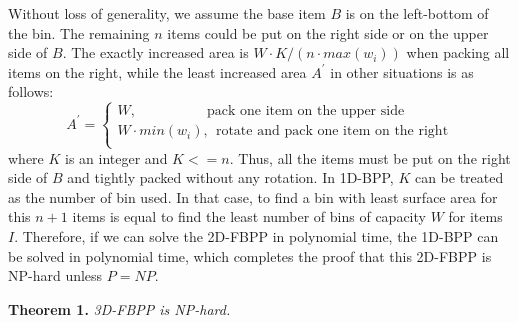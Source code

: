 Without loss of generality, we assume the base item $B$ is on the left-bottom of the bin. The remaining $n$ items could be put on the right side or on the upper side of $B$. The exactly increased area is $W\cdot K/(n\cdot max(w_i))$ when packing all items on the right, while the least increased area $A^{'}$ in other situations is as follows:
$$A^{'}=
\begin{cases}
W, \qquad\qquad\quad \text{pack one item on the upper side}\\
W \cdot min(w_i), \ \ \text{rotate and pack one item on the right} \\
\end{cases}
$$ 
where $K$ is an integer and $K<=n$. Thus, all the items must be put on the right side of $B$ and tightly packed without any rotation. In 1D-BPP, $K$ can be treated as the number of bin used. In that case, to find a bin with least surface area for this $n+1$ items is equal to find the least number of bins of capacity $W$ for items $I$. Therefore, if we can solve the 2D-FBPP in polynomial time, the 1D-BPP can be solved in polynomial time, which completes the proof that this 2D-FBPP is NP-hard unless $P = NP$.




\hspace{-1em}\textbf{Theorem 1.} \textit{3D-FBPP is NP-hard.}

